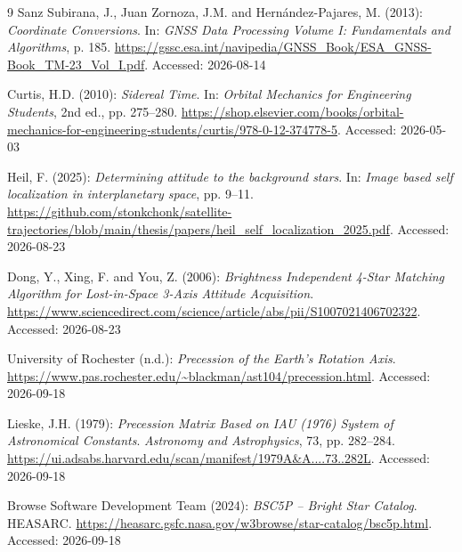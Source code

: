 \documentclass[11pt,a4paper]{article}
\begin{document}
\begin{thebibliography}{9}
		Sanz Subirana, J., Juan Zornoza, J.M. and Hernández-Pajares, M. (2013):
		\emph{Coordinate Conversions}. In: \emph{GNSS Data Processing Volume I:
			Fundamentals and Algorithms}, p. 185.
		\url{https://gssc.esa.int/navipedia/GNSS_Book/ESA_GNSS-Book_TM-23_Vol_I.pdf}.\newline
		Accessed: 2026-08-14
		
		Curtis, H.D. (2010): \emph{Sidereal Time}. In:
		\emph{Orbital Mechanics for Engineering Students}, 2nd ed., pp. 275--280.\newline
		\url{https://shop.elsevier.com/books/orbital-mechanics-for-engineering-students/curtis/978-0-12-374778-5}.\newline
		Accessed: 2026-05-03
		
		Heil, F. (2025): \emph{Determining attitude to the background stars}.
		In: \emph{Image based self localization in interplanetary space}, pp. 9--11.\newline
		\url{https://github.com/stonkchonk/satellite-trajectories/blob/main/thesis/papers/heil_self_localization_2025.pdf}.\newline
		Accessed: 2026-08-23
		
		Dong, Y., Xing, F. and You, Z. (2006):
		\emph{Brightness Independent 4-Star Matching Algorithm for Lost-in-Space
			3-Axis Attitude Acquisition}.\newline
		\url{https://www.sciencedirect.com/science/article/abs/pii/S1007021406702322}.\newline
		Accessed: 2026-08-23
		
		\newpage
		
		University of Rochester (n.d.): \emph{Precession of the Earth's Rotation Axis}.\newline
		\url{https://www.pas.rochester.edu/~blackman/ast104/precession.html}.\newline
		Accessed: 2026-09-18
		
		Lieske, J.H. (1979): \emph{Precession Matrix Based on IAU (1976) System
			of Astronomical Constants}.
		\emph{Astronomy and Astrophysics}, 73, pp. 282--284.\newline
		\url{https://ui.adsabs.harvard.edu/scan/manifest/1979A&A....73..282L}.\newline
		Accessed: 2026-09-18
		
		Browse Software Development Team (2024): \emph{BSC5P -- Bright Star Catalog}.
		HEASARC.\newline
		\url{https://heasarc.gsfc.nasa.gov/w3browse/star-catalog/bsc5p.html}.\newline
		Accessed: 2026-09-18
		

\end{thebibliography}
\end{document}
